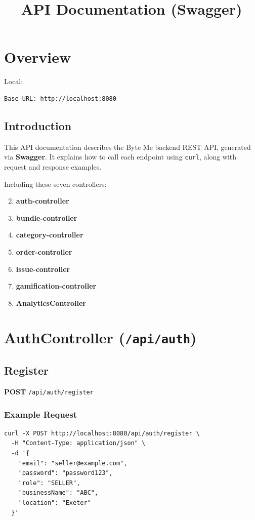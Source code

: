 \documentclass[a4paper,11pt]{article}
\title{API Documentation (Swagger)}
\begin{document}
\maketitle

\section{Overview}

Local:
\begin{lstlisting}
Base URL: http://localhost:8080
\end{lstlisting}

\subsection*{Introduction}

This API documentation describes the Byte Me backend REST API, generated via \textbf{Swagger}. It explains how to call each endpoint using \texttt{curl}, along with request and response examples.

Including these seven controllers:


\begin{enumerate}
    \setcounter{enumi}{1}
    \item \textbf{auth-controller}
    \item \textbf{bundle-controller}
    \item \textbf{category-controller}
    \item \textbf{order-controller}
    \item \textbf{issue-controller}
    \item \textbf{gamification-controller}
    \item \textbf{AnalyticsController}
\end{enumerate}






\section{ AuthController (\texttt{/api/auth})}

\subsection{Register}
\textbf{POST} \texttt{/api/auth/register}
\subsubsection*{Example Request}
\begin{lstlisting}
curl -X POST http://localhost:8080/api/auth/register \
  -H "Content-Type: application/json" \
  -d '{
    "email": "seller@example.com",
    "password": "password123",
    "role": "SELLER",
    "businessName": "ABC",
    "location": "Exeter"
  }'
\end{lstlisting}
\end{document}
